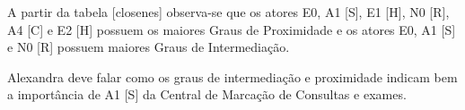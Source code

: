 A partir da tabela [closenes] observa-se que os atores E0, A1 [S], E1 [H], N0 [R], A4 [C] e E2 [H] possuem os maiores Graus de Proximidade e os atores E0, A1 [S] e N0 [R] possuem maiores Graus de Intermediação.

Alexandra deve falar como os graus de intermediação e proximidade indicam bem a importância de A1 [S] da Central de Marcação de Consultas e exames.